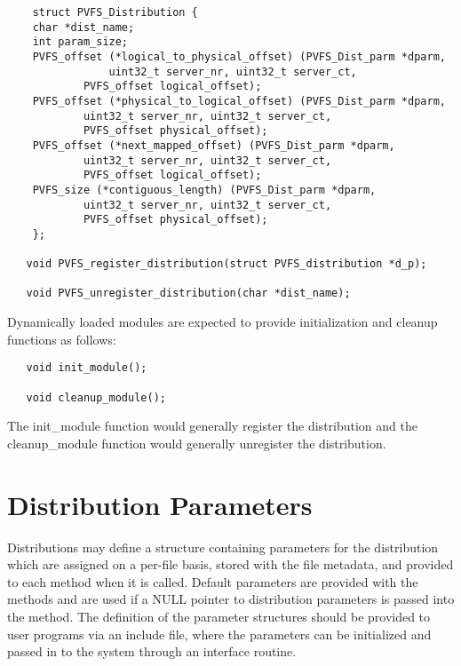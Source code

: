 \documentclass[11pt]{article}
\begin{document}
\begin{verbatim}
	struct PVFS_Distribution {
   	char *dist_name;
   	int param_size;
   	PVFS_offset (*logical_to_physical_offset) (PVFS_Dist_parm *dparm,
        		uint32_t server_nr, uint32_t server_ct,
         	PVFS_offset logical_offset);
   	PVFS_offset (*physical_to_logical_offset) (PVFS_Dist_parm *dparm,
         	uint32_t server_nr, uint32_t server_ct,
         	PVFS_offset physical_offset);
   	PVFS_offset (*next_mapped_offset) (PVFS_Dist_parm *dparm,
         	uint32_t server_nr, uint32_t server_ct,
         	PVFS_offset logical_offset);
   	PVFS_size (*contiguous_length) (PVFS_Dist_parm *dparm,
         	uint32_t server_nr, uint32_t server_ct,
         	PVFS_offset physical_offset);
	};

   void PVFS_register_distribution(struct PVFS_distribution *d_p);

   void PVFS_unregister_distribution(char *dist_name);
\end{verbatim}

Dynamically loaded modules are expected to provide initialization and
cleanup functions as follows:

\begin{verbatim}
   void init_module();

   void cleanup_module();
\end{verbatim}

The init\_module function would generally register the distribution and
the cleanup\_module function would generally unregister the
distribution.

\section{Distribution Parameters}

Distributions may define a structure containing parameters for the
distribution which are assigned on a per-file basis, stored with the
file metadata, and provided to each method when it is called.  Default
parameters are provided with the methods and are used if a NULL pointer
to distribution parameters is passed into the method.  The definition of
the parameter structures should be provided to user programs via an
include file, where the parameters can be initialized and passed in to
the system through an interface routine.
\end{document}
